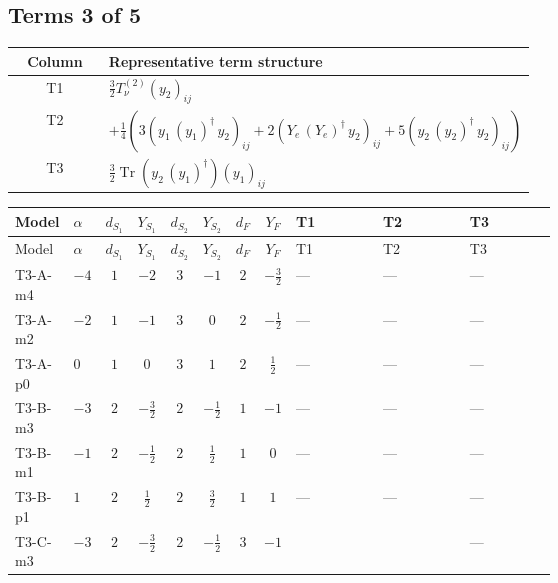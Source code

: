 \documentclass[8pt]{article}
\begin{document}
\begin{landscape}
\subsection*{Terms 3 of 5}
\begin{center}
\begin{tabular}{@{}c >{\raggedright\arraybackslash}p{0.82\linewidth}@{}}
\toprule
Column & Representative term structure \\
\midrule
T1 & \(\displaystyle \frac{3}{2} T_{\nu}^{(2)} \left({y_2}\right)_{ij}\) \\
\midrule
T2 & \(\displaystyle +\frac{1}{4} (3 \left({y_1}\,\left({y_1}\right)^{\dagger}\,{y_2}\right)_{ij}+2 \left({Y_e}\,\left({Y_e}\right)^{\dagger}\,{y_2}\right)_{ij}+5 \left({y_2}\,\left({y_2}\right)^{\dagger}\,{y_2}\right)_{ij})\) \\
\midrule
T3 & \(\displaystyle \frac{3}{2} \operatorname{Tr}\!\left({y_2}\,\left({y_1}\right)^{\dagger}\right) \left({y_1}\right)_{ij}\) \\
\midrule
\bottomrule
\end{tabular}
\end{center}
\smallskip
\tiny
\begin{longtable}{@{}llcccccc >{\raggedright\arraybackslash}p{0.21\linewidth} >{\raggedright\arraybackslash}p{0.21\linewidth} >{\raggedright\arraybackslash}p{0.21\linewidth}@{}}
\toprule
Model & $\alpha$ & $d_{S_1}$ & $Y_{S_1}$ & $d_{S_2}$ & $Y_{S_2}$ & $d_F$ & $Y_F$ & T1 & T2 & T3 \\
\midrule
\endfirsthead
\toprule
Model & $\alpha$ & $d_{S_1}$ & $Y_{S_1}$ & $d_{S_2}$ & $Y_{S_2}$ & $d_F$ & $Y_F$ & T1 & T2 & T3 \\
\midrule
\endhead
T3-A-m4 & $-4$ & $1$ & $-2$ & $3$ & $-1$ & $2$ & $-\frac{3}{2}$ & --- & --- & --- \\
\midrule
T3-A-m2 & $-2$ & $1$ & $-1$ & $3$ & $0$ & $2$ & $-\frac{1}{2}$ & --- & --- & --- \\
\midrule
T3-A-p0 & $0$ & $1$ & $0$ & $3$ & $1$ & $2$ & $\frac{1}{2}$ & --- & --- & --- \\
\midrule
T3-B-m3 & $-3$ & $2$ & $-\frac{3}{2}$ & $2$ & $-\frac{1}{2}$ & $1$ & $-1$ & --- & --- & --- \\
\midrule
T3-B-m1 & $-1$ & $2$ & $-\frac{1}{2}$ & $2$ & $\frac{1}{2}$ & $1$ & $0$ & --- & --- & --- \\
\midrule
T3-B-p1 & $1$ & $2$ & $\frac{1}{2}$ & $2$ & $\frac{3}{2}$ & $1$ & $1$ & --- & --- & --- \\
\midrule
T3-C-m3 & $-3$ & $2$ & $-\frac{3}{2}$ & $2$ & $-\frac{1}{2}$ & $3$ & $-1$ & \scriptsize\adjustbox{max width=\linewidth}{$\begin{gathered} \frac{3}{2} T_{\nu}^{(2)} \left({y_2}\right)_{ij}\end{gathered}$} & \scriptsize\adjustbox{max width=\linewidth}{$\begin{gathered} +\frac{1}{4} (3 \left({y_1}\,\left({y_1}\right)^{\dagger}\,{y_2}\right)_{ij}+2 \left({Y_e}\,\left({Y_e}\right)^{\dagger}\,{y_2}\right)_{ij}+5 \left({y_2}\,\left({y_2}\right)^{\dagger}\,{y_2}\right)_{ij})\end{gathered}$} & --- \\

\end{longtable}
\end{landscape}
\end{document}
